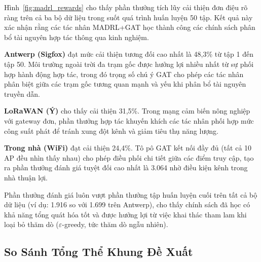 \documentclass[conference]{IEEEtran}
\begin{document}
Hình~\ref{fig:madrl_rewards} cho thấy phần thưởng tích lũy cải
thiện đơn điệu rõ ràng trên cả ba bộ dữ liệu trong suốt quá
trình huấn luyện 50 tập. Kết quả này xác nhận rằng các tác nhân
MADRL+GAT học thành công các chính sách phân bổ tài nguyên hợp
tác thông qua kinh nghiệm.

\textbf{Antwerp (Sigfox)} đạt mức cải thiện tương đối cao nhất
là 48,3\% từ tập 1 đến tập 50. Môi trường ngoài trời đa trạm
gốc được hưởng lợi nhiều nhất từ sự phối hợp hành động hợp tác,
trong đó trọng số chú ý GAT cho phép các tác nhân phân biệt giữa
các trạm gốc tương quan mạnh và yếu khi phân bổ tài nguyên truyền dẫn.

\textbf{LoRaWAN (Ý)} cho thấy cải thiện 31,5\%. Trong mạng cảm
biến nông nghiệp với gateway đơn, phần thưởng hợp tác khuyến
khích các tác nhân phối hợp mức công suất phát để tránh xung đột
kênh và giảm tiêu thụ năng lượng.

\textbf{Trong nhà (WiFi)} đạt cải thiện 24,4\%. Tô pô GAT kết
nối đầy đủ (tất cả 10 AP đều nhìn thấy nhau) cho phép điều phối
chi tiết giữa các điểm truy cập, tạo ra phần thưởng đánh giá
tuyệt đối cao nhất là 3.064 nhờ điều kiện kênh trong nhà thuận lợi.

Phần thưởng đánh giá luôn vượt phần thưởng tập huấn luyện cuối
trên tất cả bộ dữ liệu (ví dụ: 1.916 so với 1.699 trên Antwerp),
cho thấy chính sách đã học có khả năng tổng quát hóa tốt và
được hưởng lợi từ việc khai thác tham lam khi loại bỏ thăm dò
(\ensuremath{\varepsilon}\nobreakdash-greedy, tức thăm dò ngẫu nhiên).

\subsection{So Sánh Tổng Thể Khung Đề Xuất}
\label{subsec:res_overall}
\end{document}
